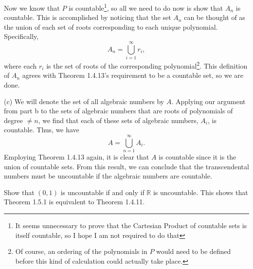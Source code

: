 \documentclass[12pt]{article}
\newcommand{\R}{\mathbb{R}}
\newenvironment{exercise}[2][Exercise]{\begin{trivlist}
\item[\hskip \labelsep {\bfseries #1}\hskip \labelsep {\bfseries #2.}]}{\end{trivlist}}
\begin{document}
Now we know that $P$ is countable\footnote{It seems unnecessary to prove that the Cartesian Product of countable sets is itself countable, so I hope I am not required to do that}, so all we need to do now is show that $A_n$ is countable. This is accomplished by noticing that the set $A_n$ can be thought of as the union of each set of roots corresponding to each unique polynomial. Specifically, 
$$A_n = \bigcup_{i=1}^{\infty}r_i,$$
where each $r_i$ is the set of roots of the corresponding polynomial\footnote{Of course, an ordering of the polynomials in $P$ would need to be defined before this kind of calculation could actually take place.}. This definition of $A_n$ agrees with Theorem 1.4.13's requirement to be a countable set, so we are done. \newline

\noindent (c) We will denote the set of all algebraic numbers by $A$. Applying our argument from part b to the sets of algebraic numbers that are roots of polynomials of degree $\neq n$, we find that each of these sets of algebraic numbers, $A_i$, is countable. Thus, we have $$A = \bigcup_{n=1}^{\infty}A_i.$$
Employing Theorem 1.4.13 again, it is clear that $A$ is countable since it is the union of countable sets. From this result, we can conclude that the transcendental numbers must be uncountable if the algebraic numbers are countable.

\begin{exercise}{1.5.1}
Show that $(0,1)$ is uncountable if and only if $\R$ is uncountable. This shows that Theorem 1.5.1 is equivalent to Theorem 1.4.11.
\end{exercise}
\end{document}
